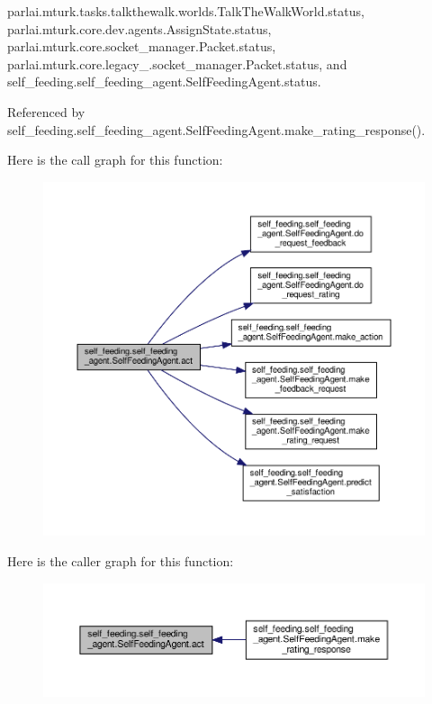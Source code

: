 parlai.\+mturk.\+tasks.\+talkthewalk.\+worlds.\+Talk\+The\+Walk\+World.\+status, parlai.\+mturk.\+core.\+dev.\+agents.\+Assign\+State.\+status, parlai.\+mturk.\+core.\+socket\+\_\+manager.\+Packet.\+status, parlai.\+mturk.\+core.\+legacy\+\_.\+socket\+\_\+manager.\+Packet.\+status, and self\+\_\+feeding.\+self\+\_\+feeding\+\_\+agent.\+Self\+Feeding\+Agent.\+status.



Referenced by self\+\_\+feeding.\+self\+\_\+feeding\+\_\+agent.\+Self\+Feeding\+Agent.\+make\+\_\+rating\+\_\+response().

Here is the call graph for this function\+:
\nopagebreak
\begin{figure}[H]
\begin{center}
\leavevmode
\includegraphics[width=350pt]{classself__feeding_1_1self__feeding__agent_1_1SelfFeedingAgent_a7306b2ce2dbf45f5ac67bd374e66718a_cgraph}
\end{center}
\end{figure}
Here is the caller graph for this function\+:
\nopagebreak
\begin{figure}[H]
\begin{center}
\leavevmode
\includegraphics[width=350pt]{classself__feeding_1_1self__feeding__agent_1_1SelfFeedingAgent_a7306b2ce2dbf45f5ac67bd374e66718a_icgraph}
\end{center}
\end{figure}
